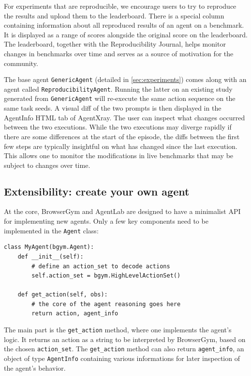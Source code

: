 \documentclass[10pt]{article} %
\newcommand{\code}[1]{\texttt{#1}}
\begin{document}
 For experiments that are reproducible, we encourage users to try to reproduce the results and upload them to the leaderboard. There is a special column containing information about all reproduced results of an agent on a benchmark. It is displayed as a range of scores alongside the original score on the leaderboard. The leaderboard, together with the Reproducibility Journal, helps monitor changes in benchmarks over time and serves as a source of motivation for the community.

 The base agent \code{GenericAgent} (detailed in \cref{sec:experiments}) comes along with an agent called \code{ReproducibilityAgent}. Running the latter on an existing study generated from \code{GenericAgent} will re-execute the same action sequence on the same task seeds. A visual diff of the two prompts is then displayed in the AgentInfo HTML tab of AgentXray. The user can inspect what changes occurred between the two executions. While the two executions may diverge rapidly if there are some differences at the start of the episode, the diffs between the first few steps are typically insightful on what has changed since the last execution. This allows one to monitor the modifications in live benchmarks that may be subject to changes over time.


\subsection{Extensibility: create your own agent}\label{sec:make-your-agent}

At the core, BrowserGym and AgentLab are designed to have a minimalist API for implementing new agents.
Only a few key components need to be implemented in the \code{Agent} class:
\vspace{-0.5em}
\begin{verbatim}
class MyAgent(bgym.Agent):
    def __init__(self):
        # define an action_set to decode actions
        self.action_set = bgym.HighLevelActionSet()
    
    def get_action(self, obs):
        # the core of the agent reasoning goes here
        return action, agent_info
\end{verbatim}

The main part is the \code{get_action} method, where one implements the agent's logic. It returns an action as a string to be interpreted by BrowserGym, based on the chosen \code{action_set}. The \code{get_action} method can also return \code{agent_info}, an object of type \code{AgentInfo} containing various informations for later inspection of the agent's behavior. 
\end{document}

